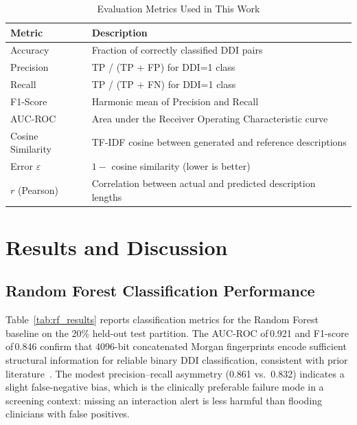 \documentclass[conference]{IEEEtran}
\begin{document}
\begin{table}[t]
\centering
\caption{Evaluation Metrics Used in This Work}
\label{tab:metrics}
\begin{tabular}{p{2.2cm} p{4.8cm}}
\toprule
\textbf{Metric} & \textbf{Description} \\
\midrule
Accuracy          & Fraction of correctly classified DDI pairs \\
Precision         & TP / (TP + FP) for DDI=1 class \\
Recall            & TP / (TP + FN) for DDI=1 class \\
F1-Score          & Harmonic mean of Precision and Recall \\
AUC-ROC           & Area under the Receiver Operating Characteristic curve \\
Cosine Similarity & TF-IDF cosine between generated and reference descriptions \\
Error $\varepsilon$ & $1 -$ cosine similarity (lower is better) \\
$r$ (Pearson)     & Correlation between actual and predicted description lengths \\
\bottomrule
\end{tabular}
\end{table}

\section{Results and Discussion}
\label{sec:results}

\subsection{Random Forest Classification Performance}

Table~\ref{tab:rf_results} reports classification metrics for the Random Forest baseline
on the 20\% held-out test partition. The AUC-ROC of\,0.921 and F1-score of\,0.846
confirm that 4096-bit concatenated Morgan fingerprints encode sufficient structural
information for reliable binary DDI classification, consistent with prior
literature~\cite{vilar2012detection,zitnik2018polypharmacy}. The modest precision--recall
asymmetry (0.861 vs.\ 0.832) indicates a slight false-negative bias, which is the
clinically preferable failure mode in a screening context: missing an interaction alert is
less harmful than flooding clinicians with false positives.
\end{document}
